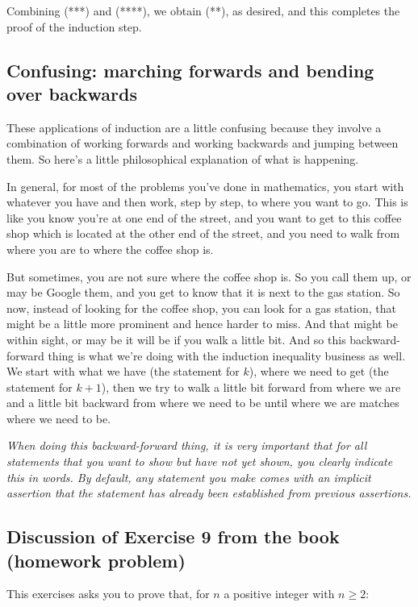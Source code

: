 \documentclass{amsart}
\begin{document}
Combining (***) and (****), we obtain (**), as desired, and this
completes the proof of the induction step.

\subsection{Confusing: marching forwards and bending over backwards}

These applications of induction are a little confusing because they
involve a combination of working forwards and working backwards and
jumping between them. So here's a little philosophical explanation of
what is happening.

In general, for most of the problems you've done in mathematics, you
start with whatever you have and then work, step by step, to where you
want to go. This is like you know you're at one end of the street, and
you want to get to this coffee shop which is located at the other end
of the street, and you need to walk from where you are to where the
coffee shop is.

But sometimes, you are not sure where the coffee shop is. So you call
them up, or may be Google them, and you get to know that it is next to
the gas station. So now, instead of looking for the coffee shop, you
can look for a gas station, that might be a little more prominent and
hence harder to miss. And that might be within sight, or may be it
will be if you walk a little bit. And so this backward-forward thing
is what we're doing with the induction inequality business as well. We
start with what we have (the statement for $k$), where we need to get
(the statement for $k + 1$), then we try to walk a little bit forward
from where we are and a little bit backward from where we need to be
until where we are matches where we need to be.

{\em When doing this backward-forward thing, it is very important that
for all statements that you want to show but have not yet shown, you
clearly indicate this in words. By default, any statement you make
comes with an implicit assertion that the statement has already been
established from previous assertions.}

\subsection{Discussion of Exercise 9 from the book (homework problem)}

This exercises asks you to prove that, for $n$ a positive integer with
$n \ge 2$:
\end{document}
